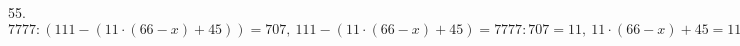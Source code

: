 55. $7777:(111-(11\cdot(66-x)+45))=707,\ 111-(11\cdot(66-x)+45)=7777:707=11,\ 11\cdot(66-x)+45=111-11=100,\ 11\cdot(66-x)=100-45=55,\ 66-x=55:11=5,\ x=66-5=61.$\\
